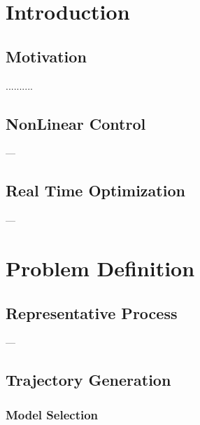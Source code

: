 \documentclass[11pt]{report}
\begin{document}
\doublespacing		%

\begin{abstract}
......
\end{abstract}%

%

\onehalfspacing	%


\tableofcontents
\listoffigures
\listoftables
%


\bodyoftext


\chapter{Introduction}

\section{Motivation}

..........

\section{NonLinear Control}

---

\section{Real Time Optimization}

---

\chapter{Problem Definition}

\section{Representative Process}

---

\section{Trajectory Generation}

\subsection{Model Selection}
\end{document}
